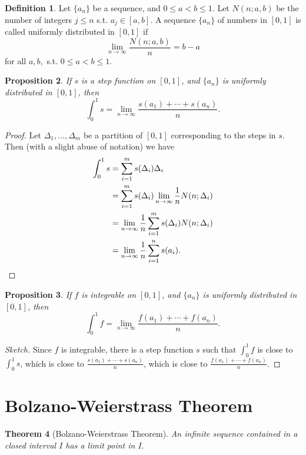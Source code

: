 \documentclass[12pt]{article}
\theoremstyle{plain}
\newtheorem{theorem}{Theorem}
\newtheorem{proposition}[theorem]{Proposition}
\theoremstyle{definition}
\newtheorem{definition}[theorem]{Definition}
\theoremstyle{remark}
\begin{document}
\begin{definition}
Let $\{a_n\}$ be a sequence, and $0 \leq a < b \leq 1$. Let $N(n; a, b)$ be the number of integers $j \leq n$ s.t. $a_j \in [a, b].$ A sequence $\{a_n\}$ of numbers in $[0, 1]$ is called uniformly distributed in $[0, 1]$ if $$\lim_{n \to \infty} \frac{N(n; a, b)}{n} = b - a$$ for all $a, b,$ s.t. $0 \leq a < b \leq 1.$
\end{definition}

\begin{proposition}
If $s$ is a step function on $[0, 1]$, and $\{a_n\}$ is uniformly distributed in $[0, 1]$, then $$\int_0^1 s = \lim_{n\to\infty} \frac{s(a_1) + \cdots + s(a_n)}{n}.$$
\end{proposition}

\begin{proof}
Let $\Delta_1, \ldots, \Delta_m$ be a partition of $[0, 1]$ corresponding to the steps in $s.$ Then (with a slight abuse of notation) we have 
\begin{align*}
\int_0^1 s &= \sum_{i=1}^m s(\Delta_i) \Delta_i \\
&= \sum_{i=1}^m s(\Delta_i) \lim_{n \to \infty} \frac{1}{n} N(n; \Delta_i) \\
&= \lim_{n \to \infty} \frac{1}{n} \sum_{i=1}^m s(\Delta_i) N(n; \Delta_i) \\
&= \lim_{n \to \infty} \frac{1}{n} \sum_{i=1}^n s(a_i).\qedhere
\end{align*}
\end{proof}

\begin{proposition}
If $f$ is integrable on $[0, 1]$, and $\{a_n\}$ is uniformly distributed in $[0, 1]$, then $$\int_0^1 f = \lim_{n\to\infty} \frac{f(a_1) + \cdots + f(a_n)}{n}.$$
\end{proposition}

\begin{proof}[Sketch]
Since $f$ is integrable, there is a step function $s$ such that $\int_0^1 f$ is close to $\int_0^1 s$, which is close to $\frac{s(a_1) + \cdots + s(a_n)}{n}$, which is close to $\frac{f(a_1) + \cdots + f(a_n)}{n}$.
\end{proof}

\section{Bolzano-Weierstrass Theorem}

\begin{theorem}[Bolzano-Weierstrass Theorem]
An infinite sequence contained in a closed interval $I$ has a limit point in $I.$
\end{theorem}
\end{document}
